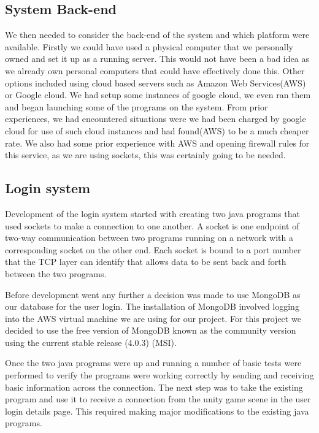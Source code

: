 \subsection {System Back-end}
We then needed to consider the back-end of the system and which platform were available. Firstly we could have used a physical computer that we personally owned and set it up as a running server. This would not have been a bad idea as we already own personal computers that could have effectively done this. Other options included using cloud based servers such as Amazon Web Services(AWS) or Google cloud. We had setup some instances of google cloud, we even ran them and began launching some of the programs on the system. From prior experiences, we had encountered situations were we had been charged by google cloud for use of such cloud instances and had found(AWS) to be a much cheaper rate. We also had some prior experience with AWS and opening firewall rules for this service, as we are using sockets, this was certainly going to be needed.\newline

\subsection {Login system}\newline
Development of the login system started with creating two java programs that used sockets to make a connection to one another. A socket is one endpoint of two-way communication between two programs running on a network with a corresponding socket on the other end. Each socket is bound to a port number that the TCP layer can identify that allows data to be sent back and forth between the two programs.\newline

Before development went any further a decision was made to use MongoDB as our database for the user login. The installation of MongoDB involved logging into the AWS virtual machine we are using for our project. For this project we decided to use the free version of MongoDB known as the community version using the current stable release (4.0.3) (MSI).\newline

Once the two java programs were up and running a number of basic tests were performed to verify the programs were working correctly by sending and receiving basic information across the connection. The next step was to take the existing program and use it to receive a connection from the unity game scene in the user login details page. This required making major modifications to the existing java programs.\newline

